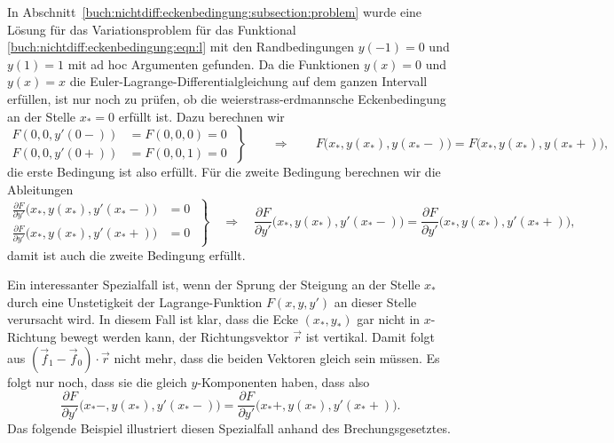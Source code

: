 \begin{beispiel}
In Abschnitt~\ref{buch:nichtdiff:eckenbedingung:subsection:problem}
wurde eine Lösung für das Variationsproblem für das Funktional
\eqref{buch:nichtdiff:eckenbedingung:eqn:l} mit den Randbedingungen
$y(-1)=0$ und $y(1)=1$ mit ad hoc Argumenten gefunden.
Da die Funktionen $y(x)=0$ und $y(x)=x$ die
Euler-Lagrange-Differentialgleichung auf dem ganzen Intervall
erfüllen, ist nur noch zu prüfen, ob die weierstrass-erdmannsche
Eckenbedingung an der Stelle $x_*=0$ erfüllt ist.
Dazu berechnen wir 
\begin{equation}
\left.
\begin{aligned}
F(0,0,y'(0-))&=F(0,0,0)=0
\\
F(0,0,y'(0+))&=F(0,0,1)=0
\end{aligned}
\;
\right\}
\qquad\Rightarrow\qquad
F\bigl(x_*,y(x_*),y(x_*-)\bigr)=F\bigl(x_*,y(x_*),y(x_*+)\bigr),
\end{equation}
die erste Bedingung ist also erfüllt.
Für die zweite Bedingung berechnen wir die Ableitungen
\[
\left.
\begin{aligned}
\frac{\partial F}{\partial y'}\bigl(x_*,y(x_*),y'(x_*-)\bigr)
&=
0
\\
\frac{\partial F}{\partial y'}\bigl(x_*,y(x_*),y'(x_*+)\bigr)
&=
0
\end{aligned}
\;\right\}
\quad\Rightarrow\quad
\frac{\partial F}{\partial y'}\bigl(x_*,y(x_*),y'(x_*-)\bigr)
=
\frac{\partial F}{\partial y'}\bigl(x_*,y(x_*),y'(x_*+)\bigr),
\]
damit ist auch die zweite Bedingung erfüllt.
\end{beispiel}

Ein interessanter Spezialfall ist, wenn der Sprung der Steigung
an der Stelle $x_*$ durch eine Unstetigkeit der Lagrange-Funktion
$F(x,y,y')$ an dieser Stelle verursacht wird.
In diesem Fall ist klar, dass die Ecke $(x_*,y_*)$ gar nicht in
$x$-Richtung bewegt werden kann, der Richtungsvektor $\vec{r}$ ist
vertikal.
Damit folgt aus $(\vec{f}_1-\vec{f}_0)\cdot\vec{r}$ nicht mehr,
dass die beiden Vektoren gleich sein müssen.
Es folgt nur noch, dass sie die gleich $y$-Komponenten haben,
dass also
\begin{equation}
\frac{\partial F}{\partial y'}\bigl(x_*-,y(x_*),y'(x_*-)\bigr)
=
\frac{\partial F}{\partial y'}\bigl(x_*+,y(x_*),y'(x_*+)\bigr).
\label{buch:nichtdiff:eckenbedingung:eqn:we0}
\end{equation}
Das folgende Beispiel illustriert diesen Spezialfall anhand des
Brechungsgesetztes.


